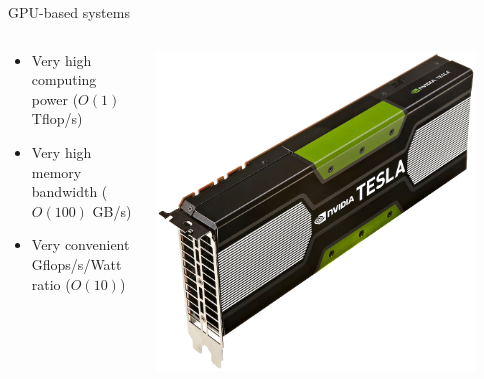 \begin{frame}[plain]{GPU-based systems}
  

  \vspace{-0.8cm}

  
  \begin{columns}
    \begin{column}{0.72\textwidth}
      \begin{itemize}
      \item Very high computing power ($O(1)$ Tflop/s)
      \item Very high memory bandwidth ($O(100)$ GB/s)
      \item Very convenient Gflops/s/Watt ratio ($O(10)$)  
      \end{itemize}
    \end{column}
    \begin{column}{0.28\textwidth}
      \begin{center}
        \includegraphics[width=0.9\textwidth]{figures/tesla.png}
      \end{center}
    \end{column}
  \end{columns}
  


\end{frame}

